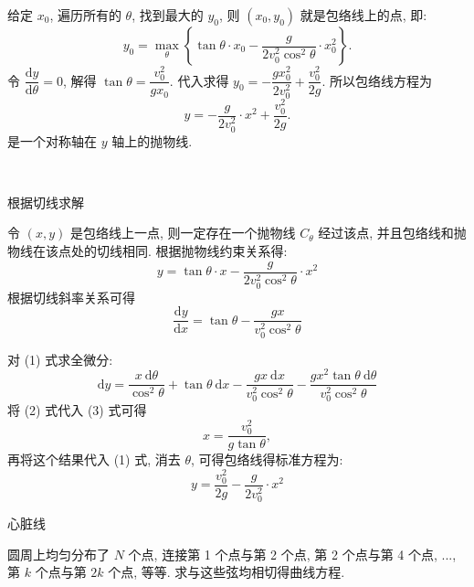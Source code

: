 给定 $x_0$, 遍历所有的 $\theta$, 找到最大的 $y_0$, 则 $(x_0,y_0)$ 就是包络线上的点, 即:
\[ y_0 = \mathop{\max}_{\theta}\left\{ \tan\theta\cdot x_0 - \frac{g}{2v_0^2\cos^2\theta}\cdot x_0^2 \right\} . \]
令 $\dfrac{\mathrm{d}y}{\mathrm{d}\theta} = 0$, 解得 $\tan\theta = \dfrac{v_0^2}{gx_0}$. 代入求得 $y_0 = -\dfrac{gx_0^2}{2v_0^2} + \dfrac{v_0^2}{2g}$.
所以包络线方程为
\[ y = -\frac{g}{2v_0^2}\cdot x^2 + \frac{v_0^2}{2g} .\]
是一个对称轴在 $y$ 轴上的抛物线.

~

\noindent 根据切线求解

令 $(x, y)$ 是包络线上一点, 则一定存在一个抛物线 $C_\theta$ 经过该点, 并且包络线和抛物线在该点处的切线相同. 根据抛物线约束关系得:
\[ y = \tan\theta\cdot x - \frac{g}{2v_0^2\cos^2\theta}\cdot x^2 \tag{1} \]
根据切线斜率关系可得
\[ \frac{\mathrm{d}y}{\mathrm{d}x} = \tan\theta - \frac{gx}{v_0^2\cos^2\theta} \tag{2} \]

对 (1) 式求全微分:
\[ \mathrm{d}y = \frac{x\ \mathrm{d}\theta}{\cos^2\theta} + \tan\theta\ \mathrm{d}x - \frac{gx\ \mathrm{d}x}{v_0^2\cos^2\theta} - \frac{gx^2\tan\theta\ \mathrm{d}\theta}{v_0^2\cos^2\theta} \tag{3} \]
将 (2) 式代入 (3) 式可得 
\[ x = \frac{v_0^2}{g\tan\theta} ,\]
再将这个结果代入 (1) 式, 消去 $\theta$, 可得包络线得标准方程为:
\[ y = \frac{v_0^2}{2g} - \frac{g}{2v_0^2} \cdot x^2 \]



\newpage

\noindent 心脏线

圆周上均匀分布了 $N$ 个点, 连接第 1 个点与第 2 个点, 第 2 个点与第 4 个点, ..., 第 $k$ 个点与第 $2k$ 个点, 等等. 求与这些弦均相切得曲线方程.
\begin{figure*}[htbp]
\centering
{}
\end{figure*}

